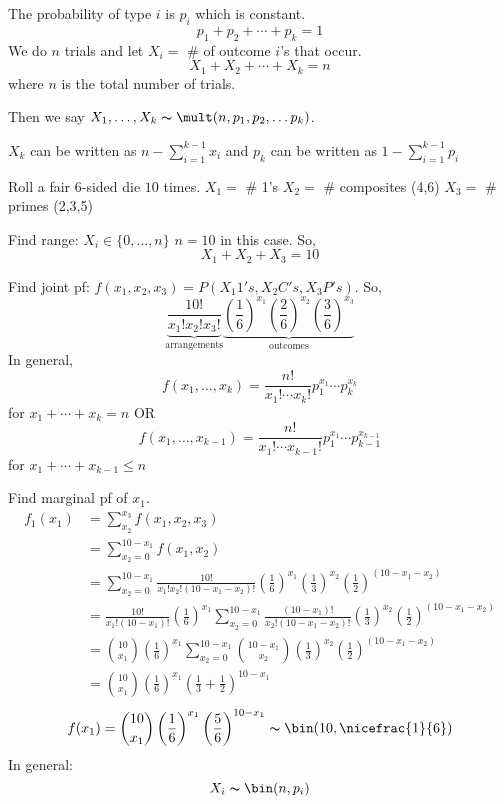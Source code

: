 The probability of type $ i $ is $ p_i $ which is constant.
\[ p_1+p_2+\cdots+p_k=1 \]
We do $ n $ trials and let $ X_i= $ \# of outcome $ i $'s that occur.
\[ X_1+X_2+\cdots+X_k=n \]
where $ n $ is the total number of trials.

Then we say $ X_1,\ldots ,X_k \thicksim \mult(n,p_1,p_2,\ldots p_k) $.
\begin{remark}
    $ X_k $ can be written as $ n-\sum\limits_{i=1}^{k-1}x_i $ and
    $ p_k $ can be written as $ 1-\sum\limits_{i=1}^{k-1} p_i $
\end{remark}


Roll a fair $6$-sided die $ 10 $ times.
$ X_1= $ \# 1's
$ X_2= $ \# composites (4,6)
$ X_3= $ \# primes (2,3,5)

Find range: $ X_i\in \{0,\ldots ,n\} $ $ n=10 $ in this case. So,
\[ X_1+X_2+X_3=10 \]

Find joint pf: $ f({x_1},{x_2},{x_3})=P(X_1 1's, X_2 C's, X_3 P's) $. So,
\[ \underbrace{\frac{10!}{{x_1}!{x_2}!{x_3}!}}_{\text{arrangements}}
\underbrace{\left( \frac{1}{6}  \right)^{x_1} 
\left( \frac{2}{6} \right)^{x_2} \left( \frac{3}{6} \right)^{x_3}}_{\text{outcomes}}\]
In general,
\[ f({x_1},\ldots,x_k)=\frac{n!}{{x_1}!\cdots x_k!}p_1^{{x_1}} \cdots p_k^{x_k}\]
for $ {x_1}+\cdots+x_k=n $
OR
\[ f({x_1},\ldots,x_{k-1})=\frac{n!}{{x_1}!\cdots x_{k-1}!}p_1^{{x_1}} \cdots
p_{k-1}^{x_{k-1}}\]
for $ {x_1}+\cdots+x_{k-1}\le n $

Find marginal pf of $ {x_1} $.
\begin{align*}
    f_1({x_1})&=\sum\limits_{{x_2}}^{{x_3}} f({x_1},{x_2},{x_3})\\
    &=\sum\limits_{{x_2}=0}^{10-{x_1}} f({x_1},{x_2})\\
    &=\sum\limits_{{x_2}=0}^{10-{x_1}} \frac{10!}{{x_1}!{x_2}!(10-{x_1}-{x_2})!}
    \left( \frac{1}{6} \right)^{x_1} 
    \left( \frac{1}{3} \right)^{x_2} \left( \frac{1}{2} \right)^{(10-{x_1}-{x_2})}\\
    &=\frac{10!}{{x_1}!(10-{x_1})!}\left( \frac{1}{6}  \right)^{x_1}
    \sum\limits_{{x_2}=0}^{10-{x_1}} \frac{(10-{x_1})!}{{x_2}!(10-{x_1}-{x_2})!}
    \left( \frac{1}{3} \right)^{x_2} \left( \frac{1}{2} \right)^{(10-{x_1}-{x_2})}\\
    &=\binom{10}{{x_1}}\left( \frac{1}{6}  \right)^{x_1}
    \sum\limits_{{x_2}=0}^{10-{x_1}} \binom{10-{x_1}}{{x_2}}
    \left( \frac{1}{3} \right)^{x_2} \left( \frac{1}{2} \right)^{(10-{x_1}-{x_2})}\\
    &=\binom{10}{{x_1}}\left( \frac{1}{6}  \right)^{x_1}
    \left(\frac{1}{3}+\frac{1}{2} \right)^{10-x_1}
\end{align*}
\[ f(x_1)=\binom{10}{{x_1}}\left( \frac{1}{6}  \right)^{x_1}
\left(\frac{5}{6} \right)^{10-x_1} \thicksim \bin(10,\nicefrac{1}{6} )\]
In general:
\[ X_i \thicksim \bin(n,p_i) \]